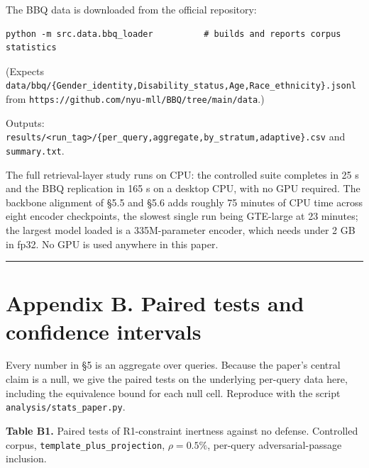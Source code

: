 \documentclass[authoryear,review,3p,times]{elsarticle}
\begin{document}
The BBQ data is downloaded from the official repository:

\begin{verbatim}
python -m src.data.bbq_loader          # builds and reports corpus statistics
\end{verbatim}

(Expects \texttt{data/bbq/\{Gender\_identity,Disability\_status,Age,Race\_ethnicity\}.jsonl}
from \texttt{https://github.com/nyu-mll/BBQ/tree/main/data}.)

Outputs: \texttt{results/\textless{}run\_tag\textgreater{}/\{per\_query,aggregate,by\_stratum,adaptive\}.csv} and \texttt{summary.txt}.

The full retrieval-layer study runs on CPU: the controlled suite completes in
25 s and the BBQ replication in 165 s on a desktop CPU, with no GPU required.
The backbone alignment of §5.5 and §5.6 adds roughly 75 minutes of CPU time
across eight encoder checkpoints, the slowest single run being GTE-large at
23 minutes; the largest model loaded is a 335M-parameter encoder, which needs
under 2 GB in fp32. No GPU is used anywhere in this paper.

\begin{center}\rule{0.5\linewidth}{0.5pt}\end{center}

\section{Appendix B. Paired tests and confidence intervals}\label{appendix-b.-paired-tests-and-confidence-intervals}

Every number in §5 is an aggregate over queries. Because the paper's central claim is a null, we give the paired tests on the underlying per-query data here, including the equivalence bound for each null cell. Reproduce with the script \texttt{analysis/stats\_paper.py}.

\textbf{Table B1.} Paired tests of R1-constraint inertness against no defense. Controlled corpus, \texttt{template\_plus\_projection}, \(\rho = 0.5\%\), per-query adversarial-passage inclusion.
\end{document}

